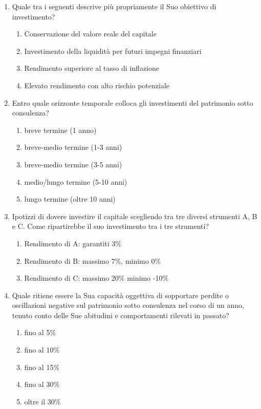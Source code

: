 \begin{itemize}
\begin{enumerate}
        \begin{enumerate}[label*=\arabic*]
            
            \item Quale tra i seguenti descrive più propriamente il Suo obiettivo di investimento?
            \begin{enumerate}
                \item Conservazione del valore reale del capitale
                \item Investimento della liquidità per futuri impegni finanziari
                \item Rendimento superiore al tasso di inflazione
                \item Elevato rendimento con alto rischio potenziale 
            \end{enumerate}

            \item Entro quale orizzonte temporale colloca gli investimenti del patrimonio sotto consulenza?
            \begin{enumerate}
                 \item breve termine (1 anno) 
                 \item breve-medio termine (1-3 anni) 
                 \item breve-medio termine (3-5 anni)
                 \item medio/lungo termine (5-10 anni) 
                 \item lungo termine (oltre 10 anni)  
            \end{enumerate} 

            \item Ipotizzi di dovere investire il capitale scegliendo tra tre diversi strumenti A, B e C. Come ripartirebbe il suo investimento tra i tre strumenti?
            \begin{enumerate}
                \item Rendimento di A: garantiti 3\%
                \item Rendimento di B: massimo 7\%, minimo 0\%
                \item Rendimento di C: massimo 20\% minimo -10\%
            \end{enumerate}

            \item Quale ritiene essere la Sua capacità oggettiva di sopportare perdite o oscillazioni negative sul patrimonio sotto consulenza nel corso di un anno, tenuto conto delle Sue abitudini e comportamenti rilevati in passato?
            \begin{enumerate}
                \item fino al 5\%
                \item fino al 10\%
                \item fino al 15\%
                \item fino al 30\%
                \item oltre il 30\%
            \end{enumerate}


\end{enumerate}
\end{enumerate}
\end{itemize}
